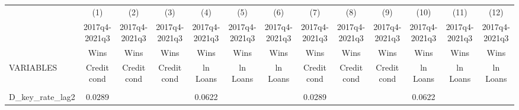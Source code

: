 \documentclass[]{article}
\begin{document}
\begin{center}
\begin{tabular}{lcccccccccccc} \hline
 & (1) & (2) & (3) & (4) & (5) & (6) & (7) & (8) & (9) & (10) & (11) & (12) \\
 & 2017q4-2021q3 & 2017q4-2021q3 & 2017q4-2021q3 & 2017q4-2021q3 & 2017q4-2021q3 & 2017q4-2021q3 & 2017q4-2021q3 & 2017q4-2021q3 & 2017q4-2021q3 & 2017q4-2021q3 & 2017q4-2021q3 & 2017q4-2021q3 \\
 & Wins & Wins & Wins & Wins & Wins & Wins & Wins & Wins & Wins & Wins & Wins & Wins \\
VARIABLES & Credit cond & Credit cond & Credit cond & ln Loans & ln Loans & ln Loans & Credit cond & Credit cond & Credit cond & ln Loans & ln Loans & ln Loans \\ \hline
\vspace{4pt} & \begin{footnotesize}\end{footnotesize} & \begin{footnotesize}\end{footnotesize} & \begin{footnotesize}\end{footnotesize} & \begin{footnotesize}\end{footnotesize} & \begin{footnotesize}\end{footnotesize} & \begin{footnotesize}\end{footnotesize} & \begin{footnotesize}\end{footnotesize} & \begin{footnotesize}\end{footnotesize} & \begin{footnotesize}\end{footnotesize} & \begin{footnotesize}\end{footnotesize} & \begin{footnotesize}\end{footnotesize} & \begin{footnotesize}\end{footnotesize} \\
D\_key\_rate\_lag2 & 0.0289 &  &  & 0.0622 &  &  & 0.0289 &  &  & 0.0622 &  &  \\

\end{tabular}
\end{center}
\end{document}
